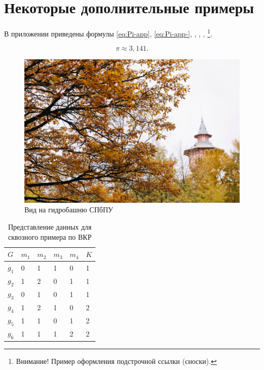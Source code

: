 \chapter{Некоторые дополнительные примеры}\label{appendix-extra-examples}							%

В приложении приведены формулы \eqref{eq:Pi-app}, \eqref{eq:Pi-app-}, , , , \footnote{Внимание! Пример оформления подстрочной ссылки (сноски).}.


\begin{equation}%
\label{eq:Pi-app-} %
\pi \approx 3,141.
\end{equation}
%
%
\begin{figure}[ht!] 
	\center
	\includegraphics [scale=0.27] {my_folder/images//spbpu_hydrotower}
	\caption{Вид на гидробашню СПбПУ \cite{spbpu-gallery}} 
	\label{fig:spbpu_hydrotower-app-}  
\end{figure}

\begin{table} [htbp]%
	\centering\small
	\caption{Представление данных для сквозного примера по ВКР \cite{Peskov2004}}%
	\label{tab:ToyCompare-app-}		
	\begin{tabular}{|l|l|l|l|l|l|}
		\hline
		$G$&$m_1$&$m_2$&$m_3$&$m_4$&$K$\\
		\hline
		$g_1$&0&1&1&0&1\\ \hline
		$g_2$&1&2&0&1&1\\ \hline
		$g_3$&0&1&0&1&1\\ \hline
		$g_4$&1&2&1&0&2\\ \hline
		$g_5$&1&1&0&1&2\\ \hline
		$g_6$&1&1&1&2&2\\ \hline		
	\end{tabular}	
	\normalsize%
\end{table}




